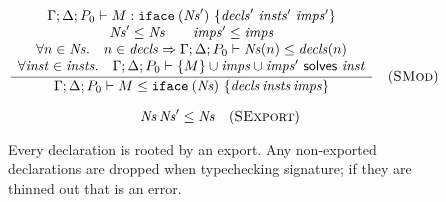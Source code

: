 \begin{figure}


\[
\frac{
\begin{array}{c}
\Gamma; \Delta; P_0 \vdash M : \texttt{iface}\:(\mathit{Ns}')~\{\mathit{decls}'~\mathit{insts}'~\mathit{imps}'\} \\
\mathit{Ns}' \le \mathit{Ns} \qquad
\mathit{imps}' \le \mathit{imps} \\
\forall n \in \mathit{Ns}.\quad n \in \mathit{decls} \Rightarrow \Gamma; \Delta; P_0 \vdash \mathit{Ns}(n) \le \mathit{decls}(n) \\
\forall \mathit{inst} \in \mathit{insts}.\quad \Gamma; \Delta; P_0 \vdash \{ M \} \cup \mathit{imps} \cup \mathit{imps}' ~\textsf{solves}~ \mathit{inst}
\end{array}
}{
\Gamma; \Delta; P_0 \vdash M \le \texttt{iface}\:(\mathit{Ns})~\{\mathit{decls}\, \mathit{insts}\, \mathit{imps}\}
}
\quad(\textsc{SMod})
\]


\[
\mathit{Ns}\, \mathit{Ns}' \le \mathit{Ns} \quad(\textsc{SExport})
\]

\caption{
Every declaration is rooted by an export.  Any non-exported declarations are dropped when typechecking signature; if they are thinned out that is an error.
}


\end{figure}


